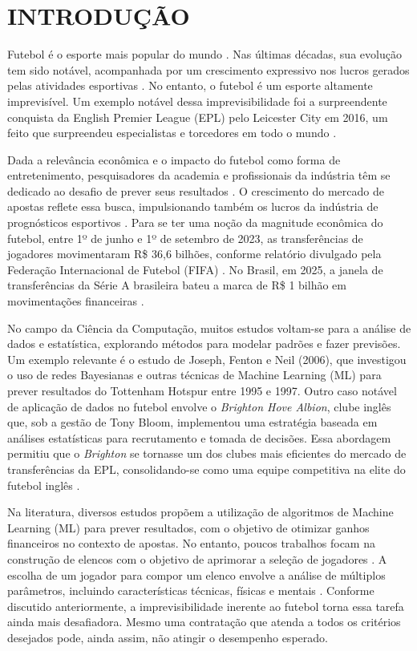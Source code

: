 \chapter{INTRODUÇÃO}

Futebol é o esporte mais popular do mundo \cite{Almulla2023}. Nas últimas décadas, sua evolução tem sido notável, acompanhada por um crescimento expressivo nos lucros gerados pelas atividades esportivas \cite{Rodrigues2022}. No entanto, o futebol é um esporte altamente imprevisível. Um exemplo notável dessa imprevisibilidade foi a surpreendente conquista da English Premier League (EPL) pelo Leicester City em 2016, um feito que surpreendeu especialistas e torcedores em todo o mundo \cite{Baboota2019}.

Dada a relevância econômica e o impacto do futebol como forma de entretenimento, pesquisadores da academia e profissionais da indústria têm se dedicado ao desafio de prever seus resultados \cite{Baboota2019}. O crescimento do mercado de apostas reflete essa busca, impulsionando também os lucros da indústria de prognósticos esportivos \cite{Rodrigues2022}. Para se ter uma noção da magnitude econômica do futebol, entre 1º de junho e 1º de setembro de 2023, as transferências de jogadores movimentaram R\$ 36,6 bilhões, conforme relatório divulgado pela Federação Internacional de Futebol (FIFA) \cite{Globo2023}. No Brasil, em 2025, a janela de transferências da Série A brasileira bateu a marca de R\$ 1 bilhão em movimentações financeiras \cite{Globo2025}.

No campo da Ciência da Computação, muitos estudos voltam-se para a análise de dados e estatística, explorando métodos para modelar padrões e fazer previsões. Um exemplo relevante é o estudo de Joseph, Fenton e Neil (2006), que investigou o uso de redes Bayesianas e outras técnicas de Machine Learning (ML) para prever resultados do Tottenham Hotspur entre 1995 e 1997. Outro caso notável de aplicação de dados no futebol envolve o \textit{Brighton Hove Albion}, clube inglês que, sob a gestão de Tony Bloom, implementou uma estratégia baseada em análises estatísticas para recrutamento e tomada de decisões. Essa abordagem permitiu que o \textit{Brighton} se tornasse um dos clubes mais eficientes do mercado de transferências da EPL, consolidando-se como uma equipe competitiva na elite do futebol inglês \cite{ESPN2023}.


Na literatura, diversos estudos propõem a utilização de algoritmos de Machine Learning (ML) para prever resultados, com o objetivo de otimizar ganhos financeiros no contexto de apostas. No entanto, poucos trabalhos focam na construção de elencos com o objetivo de aprimorar a seleção de jogadores \cite{Abidin2021}. A escolha de um jogador para compor um elenco envolve a análise de múltiplos parâmetros, incluindo características técnicas, físicas e mentais \cite{Abidin2021}. Conforme discutido anteriormente, a imprevisibilidade inerente ao futebol torna essa tarefa ainda mais desafiadora. Mesmo uma contratação que atenda a todos os critérios desejados pode, ainda assim, não atingir o desempenho esperado.

